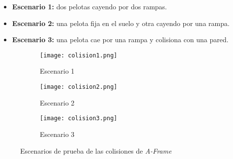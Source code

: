 \begin{itemize}
    \item \textbf{Escenario 1:} dos pelotas cayendo por dos rampas.
    \item \textbf{Escenario 2:} una pelota fija en el suelo y otra cayendo por una rampa.
    \item \textbf{Escenario 3:} una pelota cae por una rampa y colisiona con una pared.
\end{itemize}

\begin{figure}[!h]
  \begin{subfigure}[b]{0.3\textwidth}
    \texttt{[image: colision1.png]}
    \caption{Escenario 1}
  \end{subfigure}
  \hfill
  \begin{subfigure}[b]{0.3\textwidth}
    \texttt{[image: colision2.png]}
    \caption{Escenario 2}
  \end{subfigure}
    \hfill
  \begin{subfigure}[b]{0.3\textwidth}
    \texttt{[image: colision3.png]}
    \caption{Escenario 3}
  \end{subfigure}
  \caption{Escenarios de prueba de las colisiones de \textit{A-Frame}}
 \end{figure}

